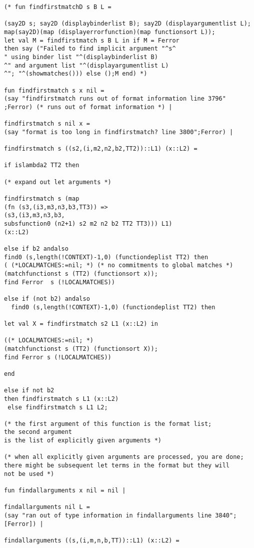 \documentclass[12pt]{article}
\begin{document}
\begin{verbatim}
(* fun findfirstmatchD s B L =

(say2D s; say2D (displaybinderlist B); say2D (displayargumentlist L);
map(say2D)(map (displayerrorfunction)(map functionsort L));
let val M = findfirstmatch s B L in if M = Ferror 
then say ("Failed to find implicit argument "^s^
" using binder list "^(displaybinderlist B)
^" and argument list "^(displayargumentlist L)
^"; "^(showmatches())) else ();M end) *)

fun findfirstmatch s x nil = 
(say "findfirstmatch runs out of format information line 3796"
;Ferror) (* runs out of format information *) |

findfirstmatch s nil x = 
(say "format is too long in findfirstmatch? line 3800";Ferror) |

findfirstmatch s ((s2,(i,m2,n2,b2,TT2))::L1) (x::L2) =

if islambda2 TT2 then

(* expand out let arguments *)

findfirstmatch s (map
(fn (s3,(i3,m3,n3,b3,TT3)) =>
(s3,(i3,m3,n3,b3,
subsfunction0 (n2+1) s2 m2 n2 b2 TT2 TT3))) L1)
(x::L2)

else if b2 andalso 
find0 (s,length(!CONTEXT)-1,0) (functiondeplist TT2) then
( (*LOCALMATCHES:=nil; *) (* no commitments to global matches *)
(matchfunctionst s (TT2) (functionsort x));
find Ferror  s (!LOCALMATCHES))

else if (not b2) andalso 
  find0 (s,length(!CONTEXT)-1,0) (functiondeplist TT2) then

let val X = findfirstmatch s2 L1 (x::L2) in

((* LOCALMATCHES:=nil; *)
(matchfunctionst s (TT2) (functionsort X));
find Ferror s (!LOCALMATCHES))

end

else if not b2 
then findfirstmatch s L1 (x::L2) 
 else findfirstmatch s L1 L2;

(* the first argument of this function is the format list;  
the second argument
is the list of explicitly given arguments *)

(* when all explicitly given arguments are processed, you are done;
there might be subsequent let terms in the format but they will
not be used *)

fun findallarguments x nil = nil |

findallarguments nil L = 
(say "ran out of type information in findallarguments line 3840";
[Ferror]) |

findallarguments ((s,(i,m,n,b,TT))::L1) (x::L2) =


\end{verbatim}
\end{document}
